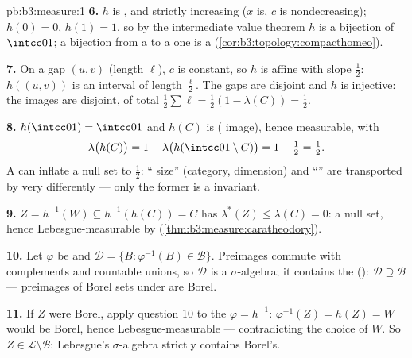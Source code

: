 \begin{solution}{pb:b3:measure:1}
\textbf{6.} $h$ is , and strictly increasing ($x$ is,
$c$ is nondecreasing); $h(0) = 0$, $h(1) = 1$, so by the
intermediate value theorem $h$ is a  bijection of
$\intcc01$; a  bijection from a  to a
 one is a 
(\cref{cor:b3:topology:compacthomeo}).

\textbf{7.} On a gap $(u, v)$ (length $\ell$), $c$ is constant,
so $h$ is affine with slope $\frac12$: $h((u,v))$ is an
interval of length $\frac\ell2$. The gaps are disjoint and $h$
is injective: the images are disjoint, of total 
$\frac12\sum\ell = \frac12(1 - \lambda(C)) = \frac12$.

\textbf{8.} $h(\intcc01) = \intcc01$ and $h(C)$ is 
( image), hence measurable, with
\[
\lambda\bigl(h(C)\bigr) = 1 -
\lambda\bigl(h(\intcc01\setminus C)\bigr) = 1 - \tfrac12 =
\tfrac12 .
\]
A  can inflate a null set to  $\frac12$:
`` size'' (category, dimension) and ``'' are
transported by  very differently --- only the
former is a  invariant.

\textbf{9.} $Z = h^{-1}(W) \subseteq h^{-1}(h(C)) = C$ has
$\lambda^*(Z) \leq \lambda(C) = 0$: a null set, hence
Lebesgue-measurable by 
(\cref{thm:b3:measure:caratheodory}).

\textbf{10.} Let $\varphi$ be  and $\mathcal D = \{B
: \varphi^{-1}(B) \in \mathcal B\}$. Preimages commute with
complements and countable unions, so $\mathcal D$ is a
$\sigma$-algebra; it contains the  ():
$\mathcal D \supseteq \mathcal B$ --- preimages of Borel sets
under  are Borel.

\textbf{11.} If $Z$ were Borel, apply question 10 to the
 $\varphi = h^{-1}$: $\varphi^{-1}(Z) = h(Z) = W$
would be Borel, hence Lebesgue-measurable --- contradicting the
choice of $W$. So $Z \in \mathcal L \setminus \mathcal B$:
Lebesgue's $\sigma$-algebra strictly contains Borel's.


\end{solution}
